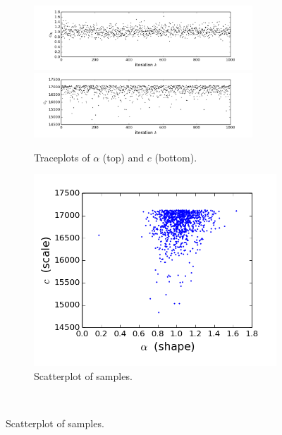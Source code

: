 \documentclass[12pt]{article}
\begin{document}
\begin{figure}
    \centering
    \begin{subfigure}[t]{1\textwidth}
        \centering
        \includegraphics[trim=0 0.4cm 0 0, clip, width=0.9\textwidth]{Pareto-a_trace.png}
        \includegraphics[trim=0 0.4cm 0 0, clip, width=0.9\textwidth]{Pareto-c_trace.png}
        \caption{Traceplots of $\alpha$ (top) and $c$ (bottom).}
    \end{subfigure}
    \begin{subfigure}[t]{0.49\textwidth}
        \centering
        \includegraphics[trim=0 0.6cm 0 0, clip, width=1\textwidth]{Pareto-scatterplot.png}
        \caption{Scatterplot of samples.}
    \end{subfigure}%
    ~ 

\end{figure}
\end{document}
